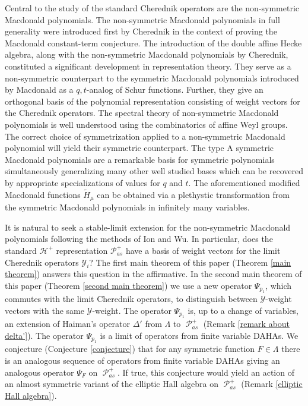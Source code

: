 \documentclass[ALCO,Unicode]{cedram}
\newcommand{\y}{{ \mathscr{Y} }}
\DeclareMathOperator{\sP}{\mathscr{P} }
\begin{document}
Central to the study of the standard Cherednik operators are the non-symmetric Macdonald polynomials. The non-symmetric Macdonald polynomials in full generality were introduced first by Cherednik \cite{C_2003} in the context of proving the Macdonald constant-term conjecture. The introduction of the double affine Hecke algebra, along with the non-symmetric Macdonald polynomials by Cherednik, constituted a significant development in representation theory. They serve as a non-symmetric counterpart to the symmetric Macdonald polynomials introduced by Macdonald as a $q,t$-analog of Schur functions. Further, they give an orthogonal basis of the polynomial representation consisting of weight vectors for the Cherednik operators. The spectral theory of non-symmetric Macdonald polynomials is well understood using the combinatorics of affine Weyl groups. The correct choice of symmetrization applied to a non-symmetric Macdonald polynomial will yield their symmetric counterpart. The type A symmetric Macdonald polynomials are a remarkable basis for symmetric polynomials simultaneously generalizing many other well studied bases which can be recovered by appropriate specializations of values for $q$ and $t$. The aforementioned modified Macdonald functions $\widetilde{H}_{\mu}$ can be obtained via a plethystic transformation from the symmetric Macdonald polynomials in infinitely many variables.

It is natural to seek a stable-limit extension for the non-symmetric Macdonald polynomials following the methods of Ion and Wu. In particular, does the standard $\mathscr{H}^{+}$ representation $\mathscr{P}_{as}^{+}$ have a basis of weight vectors for the limit Cherednik operators $\y_i$? The first main theorem of this paper (Theorem \ref{main theorem}) answers this question in the affirmative. In the second main theorem of this paper (Theorem \ref{second main theorem}) we use a new operator $\Psi_{p_1}$, which commutes with the limit Cherednik operators, to distinguish between $\y$-weight vectors with the same $\y$-weight. The operator $\Psi_{p_1}$ is, up to a change of variables, an extension of Haiman's operator $\Delta'$ \cite{HMacDG} from $\Lambda$ to $\sP_{as}^{+}$ (Remark \ref{remark about delta'}). The operator $\Psi_{p_1}$ is a limit of operators from finite variable DAHAs. We conjecture (Conjecture \ref{conjecture}) that for any symmetric function $F \in \Lambda$ there is an analogous sequence of operators from finite variable DAHAs giving an analogous operator $\Psi_{F}$ on $\sP_{as}^{+}.$ If true, this conjecture would yield an action of an almost symmetric variant of the elliptic Hall algebra \cite{BS, SV} on $\sP_{as}^{+}$ (Remark \ref{elliptic Hall algebra}).
\end{document}
